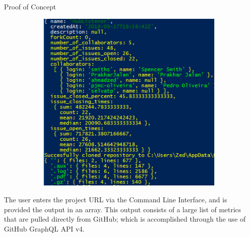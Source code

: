 \documentclass[22pt]{beamer}
\begin{document}
\begin{frame}[fragile]
\begin{textblock}{7.25}
\begin{block}{Proof of Concept}
\begin{figure}
  \begin{subfigure}{0.96\textwidth}
    \centering
     \includegraphics[width=34cm]{PowerShellPOC_p2.png} 
  \end{subfigure}
\end{figure}
The user enters the project URL via the Command Line Interface, and is provided the output in an array. This output consists of a large list of metrics that are pulled directly from GitHub; which is accomplished through the use of GitHub GraphQL API v4.

\end{block}

\end{textblock}


\end{frame}
\end{document}
